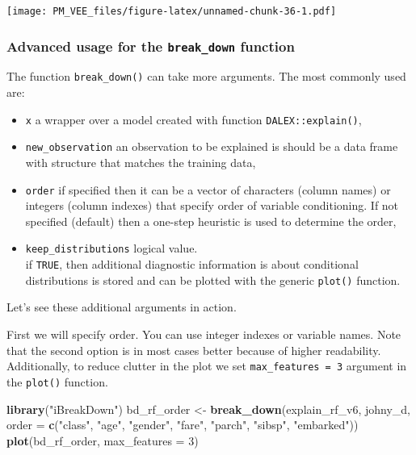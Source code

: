 \documentclass[12pt,]{krantz}
\newenvironment{Shaded}{\begin{snugshade}}{\end{snugshade}}
\newcommand{\DataTypeTok}[1]{\textcolor[rgb]{0.13,0.29,0.53}{#1}}
\newcommand{\DecValTok}[1]{\textcolor[rgb]{0.00,0.00,0.81}{#1}}
\newcommand{\KeywordTok}[1]{\textcolor[rgb]{0.13,0.29,0.53}{\textbf{#1}}}
\newcommand{\NormalTok}[1]{#1}
\newcommand{\StringTok}[1]{\textcolor[rgb]{0.31,0.60,0.02}{#1}}
\providecommand{\tightlist}{%
  \setlength{\itemsep}{0pt}\setlength{\parskip}{0pt}}
\theoremstyle{definition}
\theoremstyle{definition}
\theoremstyle{definition}
\theoremstyle{remark}
\begin{document}
\texttt{[image: PM\_VEE\_files/figure-latex/unnamed-chunk-36-1.pdf]}

\hypertarget{advanced-usage-for-the-break_down-function}{%
\subsubsection{\texorpdfstring{Advanced usage for the
\texttt{break\_down}
function}{Advanced usage for the break\_down function}}\label{advanced-usage-for-the-break_down-function}}

The function \texttt{break\_down()} can take more arguments. The most
commonly used are:

\begin{itemize}
\tightlist
\item
  \texttt{x} a wrapper over a model created with function
  \texttt{DALEX::explain()},
\item
  \texttt{new\_observation} an observation to be explained is should be
  a data frame with structure that matches the training data,
\item
  \texttt{order} if specified then it can be a vector of characters
  (column names) or integers (column indexes) that specify order of
  variable conditioning. If not specified (default) then a one-step
  heuristic is used to determine the order,
\item
  \texttt{keep\_distributions} logical value.\\
  if \texttt{TRUE}, then additional diagnostic information is about
  conditional distributions is stored and can be plotted with the
  generic \texttt{plot()} function.
\end{itemize}

Let's see these additional arguments in action.

First we will specify order. You can use integer indexes or variable
names. Note that the second option is in most cases better because of
higher readability. Additionally, to reduce clutter in the plot we set
\texttt{max\_features\ =\ 3} argument in the \texttt{plot()} function.

\begin{Shaded}
\begin{Highlighting}[]
\KeywordTok{library}\NormalTok{(}\StringTok{"iBreakDown"}\NormalTok{)}
\NormalTok{bd_rf_order <-}\StringTok{ }\KeywordTok{break_down}\NormalTok{(explain_rf_v6,}
\NormalTok{                 johny_d,}
                 \DataTypeTok{order =} \KeywordTok{c}\NormalTok{(}\StringTok{"class"}\NormalTok{, }\StringTok{"age"}\NormalTok{, }\StringTok{"gender"}\NormalTok{, }\StringTok{"fare"}\NormalTok{, }\StringTok{"parch"}\NormalTok{, }\StringTok{"sibsp"}\NormalTok{, }\StringTok{"embarked"}\NormalTok{))}
\KeywordTok{plot}\NormalTok{(bd_rf_order, }\DataTypeTok{max_features =} \DecValTok{3}\NormalTok{) }
\end{Highlighting}
\end{Shaded}
\end{document}
